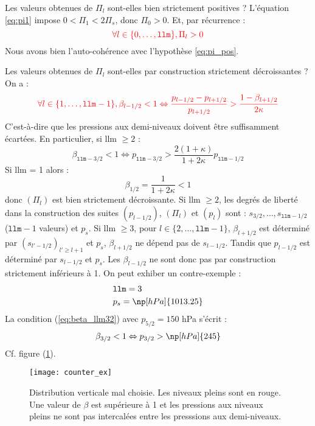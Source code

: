 \documentclass[a4paper,french]{article}
\begin{document}
Les valeurs obtenues de $\Pi_l$ sont-elles bien strictement positives
? L'équation \eqref{eq:pi1} impose $0 < \Pi_1 < 2 \Pi_s$, donc $\Pi_0
> 0$. Et, par récurrence :
\begin{equation*}
  {\color{red}
    \forall l \in \{0, \dots, \mathtt{llm}\}, \Pi_l > 0
  }
\end{equation*}
Nous avons bien l'auto-cohérence avec l'hypothèse \eqref{eq:pi_pos}.

Les valeurs obtenues de $\Pi_l$ sont-elles par construction
strictement décroissantes ? On a :
\begin{equation}
  {\color{red}
    \label{eq:betalow}
    \forall l \in \{1, \dots, \mathtt{llm} - 1\},
    \beta_{l-1/2} < 1
    \Leftrightarrow
    \frac{p_{l-1/2} - p_{l+1/2}}{p_{l+1/2}} > \frac{1 - \beta_{l+1/2}}{2 \kappa}
  }
\end{equation}
C'est-à-dire que les pressions aux demi-niveaux doivent être
suffisamment écartées. En particulier, si llm $\ge 2$ :
\begin{equation}
  \beta_{\mathtt{llm} - 3/2} < 1
  \Leftrightarrow
  p_{\mathtt{llm} - 3/2} > \frac{2 (1 + \kappa)}{1 + 2 \kappa} p_{\mathtt{llm} - 1/2}
  \label{eq:beta_llm32}
\end{equation}
Si llm = 1 alors :
\begin{equation*}
    \beta_{1/2} = \frac{1}{1 + 2 \kappa} < 1
\end{equation*}
donc $(\Pi_l)$ est bien strictement décroissante. Si llm $\ge 2$, les
degrés de liberté dans la construction des suites $(p_{l-1/2})$,
$(\Pi_l)$ et $(p_l)$ sont : $s_{3/2}, \dots, s_{\mathtt{llm}-1/2}$
($\mathtt{llm} - 1$ valeurs) et $p_s$. Si llm $\ge 3$, pour $l \in
\{2, \dots, \mathtt{llm} - 1\}$, $\beta_{l+1/2}$ est déterminé par
$(s_{l'-1/2})_{l' \ge l + 1}$ et $p_s$, $\beta_{l+1/2}$ ne dépend pas
de $s_{l-1/2}$. Tandis que $p_{l-1/2}$ est déterminé par $s_{l-1/2}$
et $p_s$. Les $\beta_{l-1/2}$ ne sont donc pas par construction
strictement inférieurs à 1. On peut exhiber un contre-exemple :
\begin{align*}
  & \mathtt{llm} = 3 \\
  & p_s = \np[hPa]{1013.25}
\end{align*}
La condition (\ref{eq:beta_llm32}) avec $p_{5/2} = 150$ hPa s'écrit :
\begin{displaymath}
  \beta_{3/2} < 1
  \Leftrightarrow p_{3/2} > \np[hPa]{245}
\end{displaymath}
Cf. figure (\ref{fig:counter_ex}).
\begin{figure}[htbp]
  \centering
  \texttt{[image: counter\_ex]}
  \caption[Distribution verticale mal choisie]{Distribution verticale
    mal choisie. Les niveaux pleins sont en rouge. Une valeur de
    $\beta$ est supérieure à 1 et les pressions aux niveaux pleins ne
    sont pas intercalées entre les presssions aux demi-niveaux.}
  \label{fig:counter_ex}
\end{figure}
\end{document}
